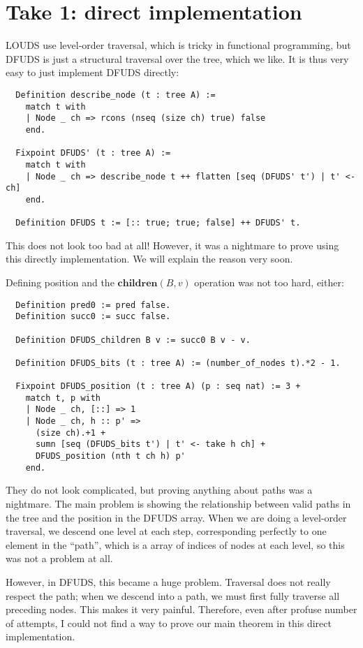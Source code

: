 \documentclass[11pt]{article}
\begin{document}
\section{Take 1: direct implementation}
LOUDS use level-order traversal, which is tricky in functional programming, but DFUDS is just a structural
traversal over the tree, which we like. It is thus very easy to just implement DFUDS directly:

\begin{verbatim}
  Definition describe_node (t : tree A) :=
    match t with
    | Node _ ch => rcons (nseq (size ch) true) false
    end.

  Fixpoint DFUDS' (t : tree A) :=
    match t with
    | Node _ ch => describe_node t ++ flatten [seq (DFUDS' t') | t' <- ch]
    end.

  Definition DFUDS t := [:: true; true; false] ++ DFUDS' t.
\end{verbatim}

This does not look too bad at all! However, it was a nightmare to prove using this directly implementation. We will
explain the reason very soon.

Defining position and the $\mathbf{children}(B, v)$ operation was not too hard, either:

\begin{verbatim}
  Definition pred0 := pred false.
  Definition succ0 := succ false.

  Definition DFUDS_children B v := succ0 B v - v.

  Definition DFUDS_bits (t : tree A) := (number_of_nodes t).*2 - 1.
  
  Fixpoint DFUDS_position (t : tree A) (p : seq nat) := 3 +
    match t, p with
    | Node _ ch, [::] => 1
    | Node _ ch, h :: p' =>
      (size ch).+1 +
      sumn [seq (DFUDS_bits t') | t' <- take h ch] +
      DFUDS_position (nth t ch h) p'
    end.
\end{verbatim}

They do not look complicated, but proving anything about paths was a nightmare. The main problem is showing the relationship between
valid paths in the tree and the position in the DFUDS array.
When we are doing a level-order traversal, we descend one level at each step, corresponding perfectly
to one element in the ``path'', which is a array of indices of nodes at each level, so this was not a problem at all.

However, in DFUDS, this became a huge problem. Traversal does not really respect the path; when we descend into a path,
we must first fully traverse all preceding nodes. This makes it very painful. Therefore, even after profuse number of
attempts, I could not find a way to prove our main theorem in this direct implementation.
\end{document}
